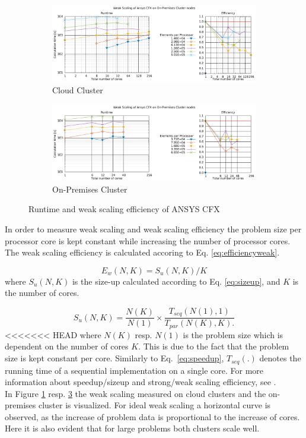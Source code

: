 \documentclass[3p,times]{elsarticle}
\begin{document}
\begin{figure}

	\begin{subfigure}{\linewidth}
		\centering
		\includegraphics[width=.7\linewidth]{gplt-a8-weak-pipe}	
		\caption{Cloud Cluster}
		\label{fig:weakA8}
	\end{subfigure}

	\begin{subfigure}{\linewidth}
		\centering
		\includegraphics[width=.7\linewidth]{gplt-hsr-weak-pipe}
		\caption{On-Premises Cluster}
		\label{fig:weakHSR}
	\end{subfigure}
	
	\caption{Runtime and weak scaling efficiency of ANSYS CFX}

\end{figure}

In order to measure weak scaling and weak scaling efficiency the problem size per processor core is kept constant while increasing the number of processor cores. The weak scaling efficiency is calculated accoring to Eq. \ref{eq:efficiencyweak}.

\begin{equation}
	\label{eq:efficiencyweak}
	E_w(N,K) = S_u(N,K) / K
\end{equation}
where $S_u(N,K)$ is the size-up calculated according to Eq. \ref{eq:sizeup}, and $K$ is the number of cores.

\begin{equation}
\label{eq:sizeup}
S_u(N,K) = \frac{N(K)}{N(1)} \times \frac{T_{seq}(N(1),1)}{T_{par}(N(K),K).}
\end{equation}
<<<<<<< HEAD
where $N(K)$ resp. $N(1)$ is the problem size which is dependent on the number of cores $K$. This is due to the fact that the problem size is kept constant per core. Similarly to Eq.~\ref{eq:speedup}, $T_{seq}(.)$ denotes the running time of a sequential implementation on a single core. For more information about speedup/sizeup and strong/weak scaling efficiency, see \cite{kaminsky15}.\\
In Figure \ref{fig:weakA8} resp. \ref{fig:weakHSR} the weak scaling measured on cloud clusters and the on-premises cluster is visualized. For ideal weak scaling a horizontal curve is observed, as the increase of problem data is proportional to the increase of cores. Here it is also evident that for large problems both clusters scale well. 
 
\end{document}
